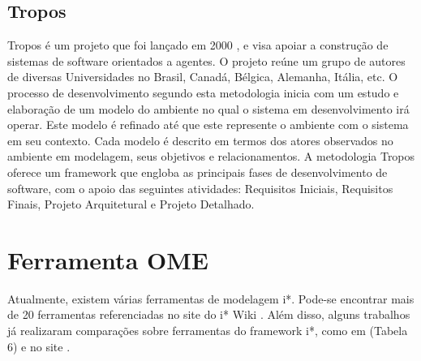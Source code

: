 
        \subsection{Tropos}
            Tropos é um projeto que foi lançado em 2000 \cite{mylopoulos2001uml}, e visa apoiar a construção de sistemas de software orientados a agentes.
            O projeto reúne um grupo de autores de diversas Universidades no Brasil, Canadá, Bélgica, Alemanha, Itália, etc.
            O processo de desenvolvimento segundo esta metodologia inicia com um estudo e elaboração de um modelo do ambiente no qual o sistema em desenvolvimento irá operar.
            Este modelo é refinado até que este represente o ambiente com o sistema em seu contexto.
            Cada modelo é descrito em termos dos atores observados no ambiente em modelagem, seus objetivos e relacionamentos.
            A metodologia Tropos oferece um framework que engloba as principais fases de desenvolvimento de software, com o apoio das seguintes atividades: Requisitos Iniciais, Requisitos Finais, Projeto Arquitetural e Projeto Detalhado.

    \section{Ferramenta OME }
        \label{cap:framework-sec:ferramentas}
            Atualmente, existem várias ferramentas de modelagem i*.
            Pode-se encontrar mais de 20 ferramentas referenciadas no site do i* Wiki \cite{site2013iwiki}.
            Além disso, alguns trabalhos já realizaram comparações sobre ferramentas do framework i*,
                como em \cite{santos2008istar}(Tabela 6) e no site \cite{site2013iwiki}.


